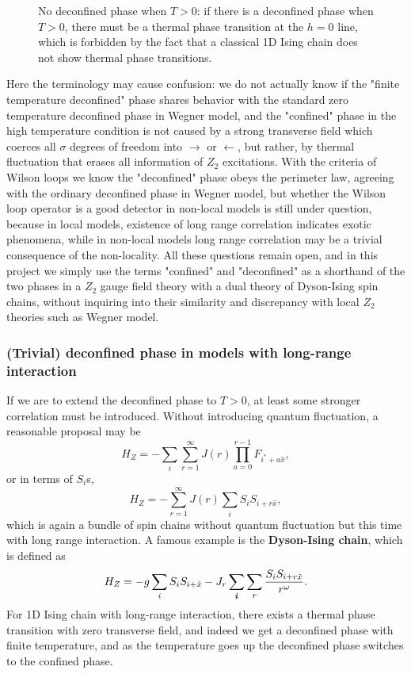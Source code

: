 \documentclass[hyperref, a4paper]{article}
\newcommand*{\concept}[1]{{\textbf{#1}}}
\newcommand*{\Ztwo}{$\mathbb{Z}_2$ }
\def\mathbb#1{#1}%
\begin{document}
\begin{figure}
    \centering
    
    \caption{No deconfined phase when $T > 0$: if there is a deconfined phase when $T > 0$, there must be a thermal phase transition at the $h=0$ line, which is forbidden by the fact that a classical 1D Ising chain does not show thermal phase transitions.}
    \label{fig:phase-diagram-expected-pure-z2}
\end{figure}

Here the terminology may cause confusion: we do not actually know if the "finite temperature deconfined" phase shares behavior with the standard zero temperature deconfined phase in Wegner model, and the "confined" phase in the high temperature condition is not caused by a strong transverse field which coerces all $\sigma$ degrees of freedom into $\rightarrow$ or $\leftarrow$, but rather, by thermal fluctuation that erases all information of \Ztwo excitations.
With the criteria of Wilson loops we know the "deconfined" phase obeys the perimeter law, agreeing with the ordinary deconfined phase in Wegner model, but whether the Wilson loop operator is a good detector in non-local models is still under question, because in local models, existence of long range correlation indicates exotic phenomena, while in non-local models long range correlation may be a trivial consequence of the non-locality.
All these questions remain open, and in this project we simply use the terms "confined" and "deconfined" as a shorthand of the two phases in a \Ztwo gauge field theory with a dual theory of Dyson-Ising spin chains, without inquiring into their similarity and discrepancy with local \Ztwo theories such as Wegner model.

\subsubsection{(Trivial) deconfined phase in models with long-range interaction}

If we are to extend the deconfined phase to $T>0$, at least some stronger correlation must be introduced.
Without introducing quantum fluctuation, a reasonable proposal may be 
\[
    H_Z = - \sum_i \sum_{r=1}^\infty J(r) \prod_{a=0}^{r-1} F_{i^*+a \hat{x}},
\]
or in terms of $S_i$s,
\[
    H_Z = - \sum_{r=1}^\infty J(r) \sum_i S_i S_{i + r \hat{x}} ,
\]
which is again a bundle of spin chains without quantum fluctuation but this time with long range interaction.
A famous example is the \concept{Dyson-Ising chain}, which is defined as
\[
    H_Z = - g \sum_i S_i S_{i+\hat{x}} - J_r \sum_{\vb*{i}} \sum_r \frac{S_i S_{i + r \hat{x}}}{r^\omega}.
\]
For 1D Ising chain with long-range interaction, there exists a thermal phase transition with zero transverse field, and indeed we get a deconfined phase with finite temperature, and as the temperature goes up the deconfined phase switches to the confined phase.
\end{document}
